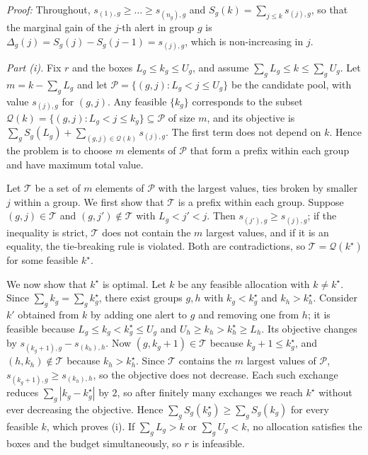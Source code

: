 \documentclass[10pt,onecolumn,letterpaper]{article}
\newenvironment{IEEEproof}[1][Proof]{\par\textit{#1:}}{\par}
\begin{document}
\begin{IEEEproof}
Throughout, $s_{(1),g}\ge\dots\ge s_{(n_g),g}$ and $S_g(k)=\sum_{j\le k}s_{(j),g}$, so that the marginal gain of the $j$-th alert in group $g$ is $\Delta_g(j)=S_g(j)-S_g(j-1)=s_{(j),g}$, which is non-increasing in $j$.

\emph{Part (i).} Fix $r$ and the boxes $L_g\le k_g\le U_g$, and assume $\sum_gL_g\le k\le\sum_gU_g$. Let $m=k-\sum_gL_g$ and let $\mathcal{P}=\{(g,j):L_g<j\le U_g\}$ be the candidate pool, with value $s_{(j),g}$ for $(g,j)$. Any feasible $\{k_g\}$ corresponds to the subset $\mathcal{Q}(k)=\{(g,j):L_g<j\le k_g\}\subseteq\mathcal{P}$ of size $m$, and its objective is $\sum_gS_g(L_g)+\sum_{(g,j)\in\mathcal{Q}(k)}s_{(j),g}$. The first term does not depend on $k$. Hence the problem is to choose $m$ elements of $\mathcal{P}$ that form a prefix within each group and have maximum total value.

Let $\mathcal{T}$ be a set of $m$ elements of $\mathcal{P}$ with the largest values, ties broken by smaller $j$ within a group. We first show that $\mathcal{T}$ is a prefix within each group. Suppose $(g,j)\in\mathcal{T}$ and $(g,j')\notin\mathcal{T}$ with $L_g<j'<j$. Then $s_{(j'),g}\ge s_{(j),g}$; if the inequality is strict, $\mathcal{T}$ does not contain the $m$ largest values, and if it is an equality, the tie-breaking rule is violated. Both are contradictions, so $\mathcal{T}=\mathcal{Q}(k^\star)$ for some feasible $k^\star$.

We now show that $k^\star$ is optimal. Let $k$ be any feasible allocation with $k\ne k^\star$. Since $\sum_gk_g=\sum_gk^\star_g$, there exist groups $g,h$ with $k_g<k^\star_g$ and $k_h>k^\star_h$. Consider $k'$ obtained from $k$ by adding one alert to $g$ and removing one from $h$; it is feasible because $L_g\le k_g<k^\star_g\le U_g$ and $U_h\ge k_h>k^\star_h\ge L_h$. Its objective changes by $s_{(k_g+1),g}-s_{(k_h),h}$. Now $(g,k_g+1)\in\mathcal{T}$ because $k_g+1\le k^\star_g$, and $(h,k_h)\notin\mathcal{T}$ because $k_h>k^\star_h$. Since $\mathcal{T}$ contains the $m$ largest values of $\mathcal{P}$, $s_{(k_g+1),g}\ge s_{(k_h),h}$, so the objective does not decrease. Each such exchange reduces $\sum_g|k_g-k^\star_g|$ by $2$, so after finitely many exchanges we reach $k^\star$ without ever decreasing the objective. Hence $\sum_gS_g(k^\star_g)\ge\sum_gS_g(k_g)$ for every feasible $k$, which proves (i). If $\sum_gL_g>k$ or $\sum_gU_g<k$, no allocation satisfies the boxes and the budget simultaneously, so $r$ is infeasible.


\end{IEEEproof}
\end{document}
